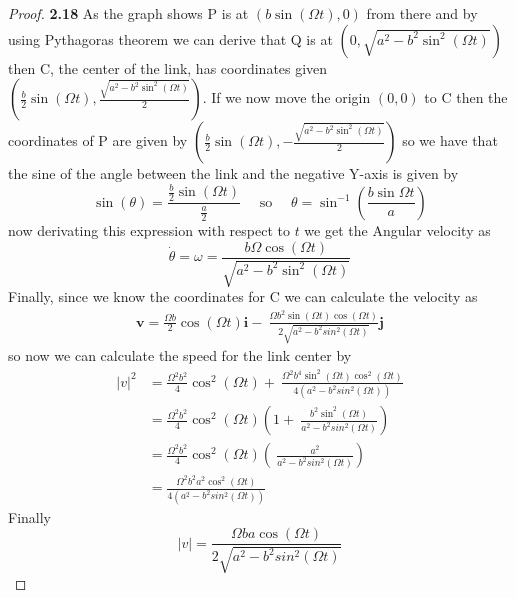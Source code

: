 \documentclass[11pt]{article}
\begin{document}
    \begin{proof}{\textbf{2.18}}
        As the graph shows P is at $(b \sin(\Omega t), 0)$ from there and by
        using Pythagoras theorem we can derive that Q is at
        $(0, \sqrt{a^2 - b^2 \sin^2(\Omega t)})$ then C, the center
        of the link, has coordinates given 
        $(\frac{b}{2}\sin(\Omega t), \frac{\sqrt{a^2 - b^2 \sin^2(\Omega t)}}{2})$.
        If we now move the origin $(0, 0)$ to C then the coordinates of P are
        given by $(\frac{b}{2}\sin(\Omega t), -\frac{\sqrt{a^2 - b^2 \sin^2(\Omega t)}}{2})$
        so we have that the sine of the angle between the link and the negative
        Y-axis is given by  
        $$\sin(\theta) = \frac{\frac{b}{2}\sin(\Omega t)}{\frac{a}{2}} \quad\text{ so }\quad
        \theta = \sin^{-1}\left(\frac{b \sin{\Omega t}}{a}\right)$$
        now derivating this expression with respect to $t$ we get the Angular 
        velocity as
        $$\dot{\theta} = \omega = \frac{b\Omega\cos(\Omega t)}{\sqrt{a^2 - b^2\sin^2(\Omega t)}}$$
        Finally, since we know the coordinates for C we can calculate the
        velocity as
        \begin{align*}
            \bm{v} = \frac{\Omega b}{2}\cos(\Omega t) \bm{i} - \ 
            \frac{\Omega b^2 \sin(\Omega t) \cos(\Omega t)}{2\sqrt{a^2 - b^2 sin^2(\Omega t)}} \bm{j} 
        \end{align*}        
        so now we can calculate the speed for the link center by  
        \begin{align*}
            |v|^2 &= \frac{\Omega^2b^2}{4}\cos^2(\Omega t) + \
            \frac{\Omega^2 b^4 \sin^2(\Omega t) \cos^2(\Omega t)}{4(a^2 - b^2 sin^2(\Omega t))} \\
                  &= \frac{\Omega^2b^2}{4}\cos^2(\Omega t) \left(1 + \ 
                  \frac{b^2 \sin^2(\Omega t)}{a^2 - b^2 sin^2(\Omega t)}\right) \\
                  &= \frac{\Omega^2b^2}{4}\cos^2(\Omega t) \left( \ 
                  \frac{a^2}{a^2 - b^2 sin^2(\Omega t)}\right) \\
                  &= \frac{\Omega^2b^2a^2 \cos^2(\Omega t)}{4(a^2 - b^2 sin^2(\Omega t))}
        \end{align*}
        Finally
        $$|v| = \frac{\Omega ba\cos(\Omega t)}{2\sqrt{a^2 - b^2 sin^2(\Omega t)}}$$
    \end{proof}
\end{document}
